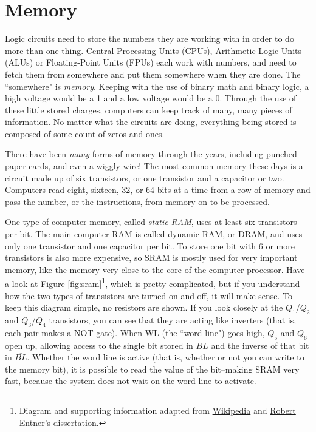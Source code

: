 \newpage
\section*{Memory}

Logic circuits need to store the numbers they are working with in order to do more than one thing. Central Processing Units (CPUs), Arithmetic Logic Units (ALUs) or Floating-Point Units (FPUs) each work with numbers, and need to fetch them from somewhere and put them somewhere when they are done. The ``somewhere" is \emph{memory}. Keeping with the use of binary math and binary logic, a high voltage would be a 1 and a low voltage would be a 0. Through the use of these little stored charges, computers can keep track of many, many pieces of information. No matter what the circuits are doing, everything being stored is composed of some count of zeros and ones. 

There have been \emph{many} forms of memory through the years, including punched paper cards, and even a wiggly wire! The most common memory these days is a circuit made up of six transistors, or one transistor and a capacitor or two. Computers read eight, sixteen, 32, or 64 bits at a time from a row of memory and pass the number, or the instructions, from memory on to be processed.

One type of computer memory, called \emph{static RAM}, uses at least six transistors per bit. The main computer RAM is called dynamic RAM, or DRAM, and uses only one transistor and one capacitor per bit. To store one bit with 6 or more transistors is also more expensive, so SRAM is mostly used for very important memory, like the memory very close to the core of the computer processor. Have a look at Figure \ref{fig:sram}\footnote{Diagram and supporting information adapted from {\color{webblue}\href{https://en.wikipedia.org/wiki/Static_random-access_memory}{Wikipedia}} and {\color{webblue}\href{https://www.entner.net/sites/default/files/diss-entner-final-v1.pdf}{Robert Entner's dissertation}}.}, 
which is pretty complicated, but if you understand how the two types of transistors are turned on and off, it will make sense. To keep this diagram simple, no resistors are shown. If you look closely at the $Q_1$/$Q_2$ and $Q_3$/$Q_4$ transistors, you can see that they are acting like inverters (that is, each pair makes a NOT gate). When WL (the ``word line") goes high, $Q_5$ and $Q_6$ open up, allowing access to the single bit stored in $BL$ and the inverse of that bit in $\overline{BL}$. Whether the word line is active (that is, whether or not you can write to the memory bit), it is possible to read the value of the bit--making SRAM very fast, because the system does not wait on the word line to activate.

